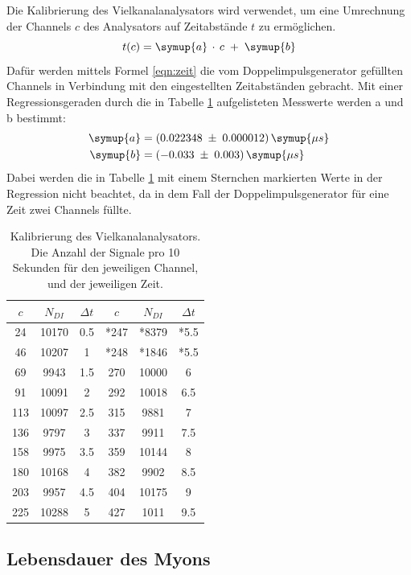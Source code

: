 Die Kalibrierung des Vielkanalanalysators wird verwendet, um eine Umrechnung der
Channels $c$ des Analysators auf Zeitabstände $t$ zu ermöglichen.
\begin{equation}
  t(c) = \symup{a}\,\cdot\,c\;+\;\symup{b}
  \label{eqn:zeit}
\end{equation}
Dafür werden mittels Formel \ref{eqn:zeit}
die vom Doppelimpulsgenerator gefüllten Channels in Verbindung mit den eingestellten
Zeitabständen gebracht. Mit einer Regressionsgeraden durch die in Tabelle \ref{tab:zeit} aufgelisteten Messwerte werden a und b bestimmt:
\begin{align*}
  \symup{a} &= (0.022348\;\pm\;0.000012)\,\symup{\mu s}\\
  \symup{b} &= (-0.033\;\pm\;0.003)\,\symup{\mu s}\\
\end{align*}
Dabei werden die in Tabelle \ref{tab:zeit} mit einem Sternchen markierten Werte in der Regression
nicht beachtet, da in dem Fall der Doppelimpulsgenerator für eine Zeit zwei Channels füllte.
\begin{table}
  \centering
  \caption{Kalibrierung des Vielkanalanalysators. Die Anzahl der Signale pro 10 Sekunden für den jeweiligen Channel, und der jeweiligen Zeit.}
  \label{tab:zeit}
  \begin{tabular}{c c c | c c c}
    \toprule
    $c$ & $N_{DI}$ & $\Delta t$ & $c$ & $N_{DI}$ & $\Delta t$\\
    \midrule
    24  & 10170 & 0.5 & *247& *8379 & *5.5\\
    46  & 10207 &  1  & *248& *1846 & *5.5\\
    69  & 9943  & 1.5 & 270 & 10000 &  6\\
    91  & 10091 &  2  & 292 & 10018 & 6.5\\
    113 & 10097 & 2.5 & 315 & 9881  & 7\\
    136 & 9797  &  3  & 337 & 9911  & 7.5\\
    158 & 9975  & 3.5 & 359 & 10144 & 8\\
    180 & 10168 &  4  & 382 & 9902  & 8.5\\
    203 & 9957  & 4.5 & 404 & 10175 & 9\\
    225 & 10288 &  5  & 427 & 1011  & 9.5\\
    \bottomrule
  \end{tabular}
\end{table}

\subsection{Lebensdauer des Myons}
\label{sec:lebensdauer}

